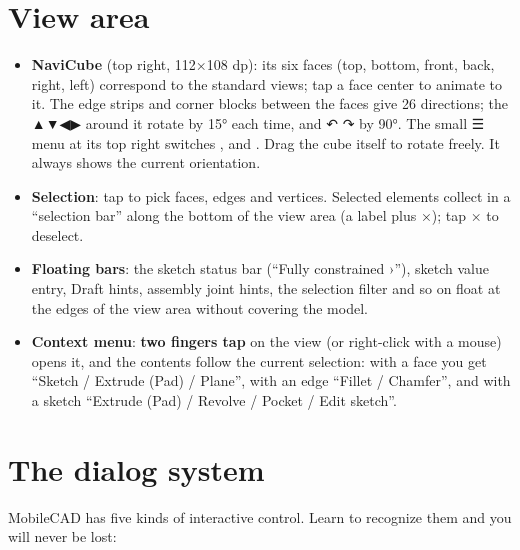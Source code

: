 
\section{View area}

\begin{itemize}
  \item \textbf{NaviCube} (top right, 112×108 dp): its six faces (top, bottom, front, back, right, left)
        correspond to the standard views; tap a face center to animate to it. The edge strips and corner blocks
        between the faces give 26 directions; the ▲▼◀▶ around it rotate by 15° each time, and ↶ ↷ by 90°. The
        small ☰ menu at its top right switches ,  and .
        Drag the cube itself to rotate freely. It always shows the current orientation.
  \item \textbf{Selection}: tap to pick faces, edges and vertices. Selected elements collect in a “selection
        bar” along the bottom of the view area (a label plus ×); tap × to deselect.
  \item \textbf{Floating bars}: the sketch status bar (“Fully constrained ›”), sketch value entry, Draft hints,
        assembly joint hints, the selection filter and so on float at the edges of the view area without
        covering the model.
  \item \textbf{Context menu}: \textbf{two fingers tap} on the view (or right-click with a mouse) opens it, and
        the contents follow the current selection: with a face you get “Sketch / Extrude (Pad) / Plane”, with an
        edge “Fillet / Chamfer”, and with a sketch “Extrude (Pad) / Revolve / Pocket / Edit sketch”.
\end{itemize}

\section{The dialog system}

MobileCAD has five kinds of interactive control. Learn to recognize them and you will never be lost:

